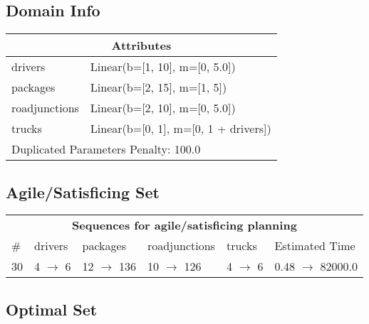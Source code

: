 \documentclass{article}
\begin{document}
                    \subsection*{Domain Info}

                    \begin{center}
                    \begin{tabular}{p{}p{}}
                    \multicolumn{2}{c}{\bf \large Attributes}\\\midrule
                    drivers & Linear(b=[1, 10], m=[0, 5.0])\\
packages & Linear(b=[2, 15], m=[1, 5])\\
roadjunctions & Linear(b=[2, 10], m=[0, 5.0])\\
trucks & Linear(b=[0, 1], m=[0, 1 + drivers])
                    
                     \\\midrule
                    \multicolumn{2}{l}{Duplicated Parameters Penalty: 100.0}
                    \end{tabular}
                    \end{center}
                
                         \subsection*{Agile/Satisficing Set}

                        \begin{center}
                        \begin{tabular}{l|l|l|l|l|l}
                        \multicolumn{6}{c}{\bf \large Sequences for agile/satisficing planning}\\
                        \# & drivers & packages & roadjunctions & trucks & Estimated Time\\\midrule
                        30&4 $\rightarrow$ 6&12 $\rightarrow$ 136&10 $\rightarrow$ 126&4 $\rightarrow$ 6&0.48 $\rightarrow$ 82000.0
                        \end{tabular}
                        \end{center}
                    
                            \subsection*{Optimal Set}
\end{document}
